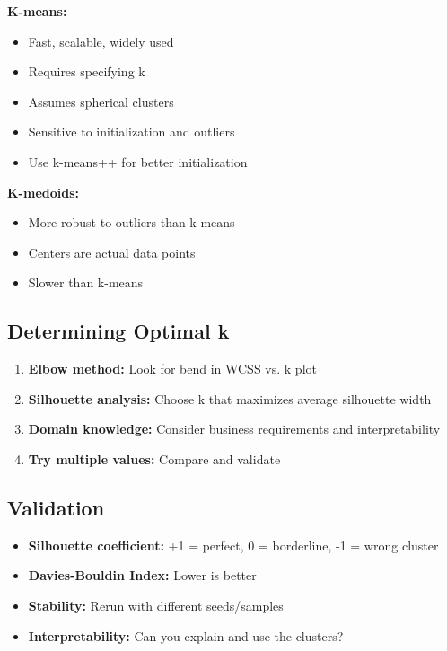 \documentclass[
]{article}
\begin{document}
\textbf{K-means:}

\begin{itemize}
\item
  Fast, scalable, widely used
\item
  Requires specifying k
\item
  Assumes spherical clusters
\item
  Sensitive to initialization and outliers
\item
  Use k-means++ for better initialization
\end{itemize}

\textbf{K-medoids:}

\begin{itemize}
\item
  More robust to outliers than k-means
\item
  Centers are actual data points
\item
  Slower than k-means
\end{itemize}

\textbf{ }

\subsection{Determining Optimal k}

\begin{enumerate}
\item
  \textbf{Elbow method:} Look for bend in WCSS vs. k plot
\item
  \textbf{Silhouette analysis:} Choose k that maximizes average
  silhouette width
\item
  \textbf{Domain knowledge:} Consider business requirements and
  interpretability
\item
  \textbf{Try multiple values:} Compare and validate
\end{enumerate}

\textbf{ }

\subsection{Validation}

\begin{itemize}
\item
  \textbf{Silhouette coefficient:} +1 = perfect, 0 = borderline, -1 =
  wrong cluster
\item
  \textbf{Davies-Bouldin Index:} Lower is better
\item
  \textbf{Stability:} Rerun with different seeds/samples
\item
  \textbf{Interpretability:} Can you explain and use the clusters?
\end{itemize}
\end{document}

